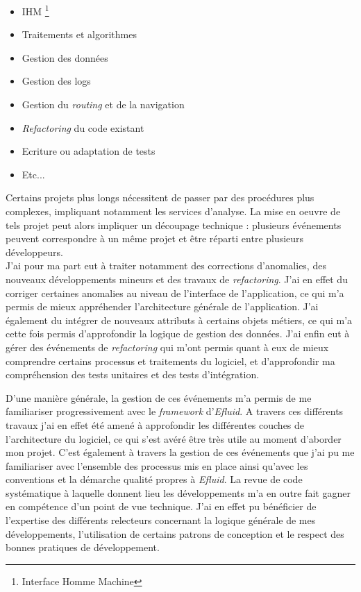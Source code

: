 \documentclass[a4paper, 12pt]{report}
\begin{document}
\begin{itemize}
  \item IHM \footnote{Interface Homme Machine}
  \item Traitements et algorithmes
  \item Gestion des données
  \item Gestion des logs
  \item Gestion du \textit{routing} et de la navigation
  \item \textit{Refactoring} du code existant
  \item Ecriture ou adaptation de tests
  \item Etc...
\end{itemize}
\vspace{0.5cm}

Certains projets plus longs nécessitent de passer par des procédures plus complexes, impliquant notamment les services d'analyse. La mise en oeuvre de tels projet peut alors impliquer un découpage technique : plusieurs événements peuvent correspondre à un même projet et être réparti entre plusieurs développeurs.\\

J'ai pour ma part eut à traiter notamment des corrections d'anomalies, des nouveaux développements mineurs et des travaux de \textit{refactoring}. J'ai en effet du corriger certaines anomalies au niveau de l'interface de l'application, ce qui m'a permis de mieux appréhender l'architecture générale de l'application. J'ai également du intégrer de nouveaux attributs à certains objets métiers, ce qui m'a cette fois permis d'approfondir la logique de gestion des données. J'ai enfin eut à gérer des événements de \textit{refactoring} qui m'ont permis quant à eux de mieux comprendre certains processus et traitements du logiciel, et d'approfondir ma compréhension des tests unitaires et des tests d'intégration.

D'une manière générale, la gestion de ces événements m'a permis de me familiariser progressivement avec le \textit{framework} d'\textit{Efluid}. A travers ces différents travaux j'ai en effet été amené à approfondir les différentes couches de l'architecture du logiciel, ce qui s'est avéré être très utile au moment d'aborder mon projet. C'est également à travers la gestion de ces événements que j'ai pu me familiariser avec l'ensemble des processus mis en place ainsi qu'avec les conventions et la démarche qualité propres à \textit{Efluid}. La revue de code systématique à laquelle donnent lieu les développements m'a en outre fait gagner en compétence d'un point de vue technique. J'ai en effet pu bénéficier de l'expertise des différents relecteurs concernant la logique générale de mes développements, l'utilisation de certains patrons de conception et le respect des bonnes pratiques de développement.
\end{document}
